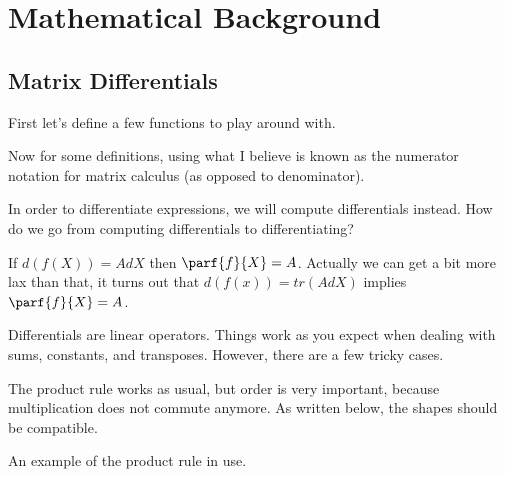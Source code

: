 \documentclass[12pt]{article}
\begin{document}
\section{Mathematical Background}

\subsection{Matrix Differentials}

First let's define a few functions to play around with.


Now for some definitions, using what I believe is known as the numerator notation for matrix calculus (as opposed to denominator).



In order to differentiate expressions, we will compute differentials instead. How do we go from computing differentials to differentiating?

If $d(f(X)) = AdX$ then $\parf{f}{X} = A$. Actually we can get a bit more lax than that, it turns out that $d(f(x)) = tr(AdX)$ implies $\parf{f}{X} = A$. 

Differentials are linear operators. Things work as you expect when dealing with sums, constants, and transposes. However, there are a few tricky cases.

The product rule works as usual, but order is very important, because multiplication does not commute anymore. As written below, the shapes should be compatible. 

An example of the product rule in use.

\end{document}
